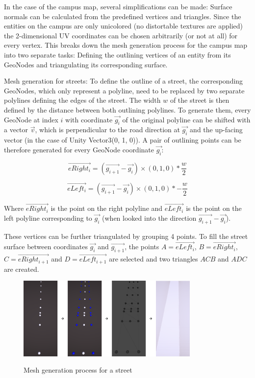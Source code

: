 In the case of the campus map, several simplifications can be made: Surface normals can be calculated from the predefined vertices and triangles. Since the entities on the campus are only unicolored (no distortable textures are applied) the 2-dimensional UV coordinates can be chosen arbitrarily (or not at all) for every vertex. This breaks down the mesh generation process for the campus map into two separate tasks: Defining the outlining vertices of an entity from its GeoNodes and triangulating its corresponding surface.

Mesh generation for streets: To define the outline of a street, the corresponding GeoNodes, which only represent a polyline, need to be replaced by two separate polylines defining the edges of the street. The width $w$ of the street is then defined by the distance between both outlining polylines. To generate them, every GeoNode at index $i$ with coordinate $\vec{g_{i}}$ of the original polyline can be shifted with a vector $\vec{v}$, which is perpendicular to the road direction at $\vec{g_{i}}$ and the up-facing vector (in the case of Unity Vector3(0, 1, 0)). A pair of outlining points can be therefore generated for every GeoNode coordinate $\vec{g_{i}}$:

\[\vec{eRight_{i}} = (\vec{g_{i + 1}} - \vec{g_{i}}) \times (0, 1, 0) * \frac{w}{2}\]

\[\vec{eLeft_{i}} = (\vec{g_{i + 1}} - \vec{g_{i}}) \times (0, 1, 0) * - \frac{w}{2}\]

Where $\vec{eRight_{i}}$ is the point on the right polyline and $\vec{eLeft_{i}}$ is the point on the left polyline corresponding to $\vec{g_{i}}$ (when looked into the direction $\vec{g_{i + 1}} - \vec{g_{i}}$).

These vertices can be further triangulated by grouping 4 points. To fill the street surface between coordinates $\vec{g_{i}}$ and $\vec{g_{i + 1}}$, the points $A = \vec{eLeft_{i}}$, $B = \vec{eRight_{i}}$, $C = \vec{eRight_{i + 1}}$ and $D = \vec{eLeft_{i + 1}}$ are selected and two triangles $ACB$ and $ADC$ are created.

\begin{figure}[H]
	\centering
	\includegraphics[width=0.8\textwidth]{images/street_mesh_generation.png}\\
	\caption{Mesh generation process for a street}
\end{figure}

